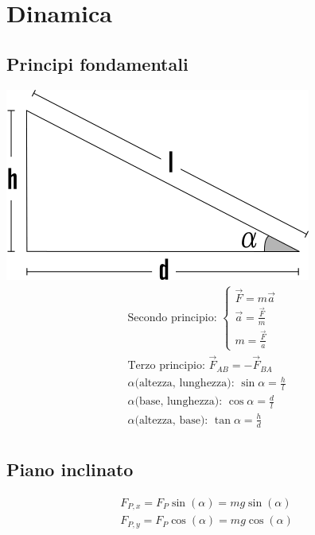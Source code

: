 \section{Dinamica}

\subsection{Principi fondamentali}

\includegraphics[width=0.4\linewidth]{Dinamica/piano-inclinato-senza-angolo.png} \\

\begin{gather*}
\text{Secondo principio: }
\begin{cases}
    \vec{F} = m \vec{a} \\
    \vec{a} = \frac{\vec{F}}{m} \\
    m = \frac{\vec{F}}{a}
\end{cases} \\
\text{Terzo principio: } \vec{F}_{AB} = -\vec{F}_{BA} \\
\text{$\alpha$(altezza, lunghezza): }\sin{\alpha} = \frac{h}{l} \\ 
\text{$\alpha$(base, lunghezza): }\cos{\alpha} = \frac{d}{l} \\
\text{$\alpha$(altezza, base): }\tan{\alpha} = \frac{h}{d} \\
\end{gather*}
\subsection{Piano inclinato}
\begin{gather*}
    F_{P, x} = F_P \sin (\alpha) = m g \sin (\alpha) \\
    F_{P, y} = F_P \cos (\alpha) = m g \cos (\alpha) 
\end{gather*}
